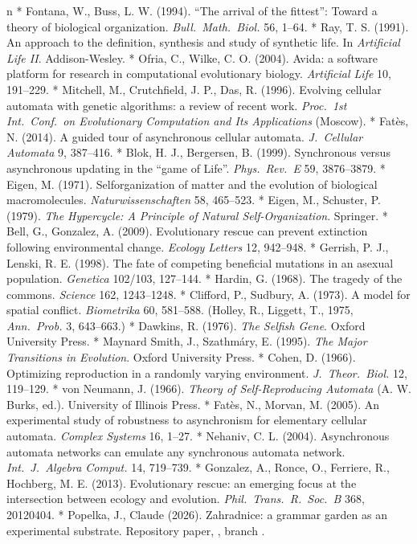 \begitems\style n
* Fontana, W., Buss, L. W. (1994). “The arrival of the fittest”:
Toward a theory of biological organization. {\it Bull.\ Math.\
Biol.} 56, 1--64.
* Ray, T. S. (1991). An approach to the definition, synthesis and
study of synthetic life. In {\it Artificial Life II}. Addison-Wesley.
* Ofria, C., Wilke, C. O. (2004). Avida: a software platform for
research in computational evolutionary biology. {\it Artificial
Life} 10, 191--229.
* Mitchell, M., Crutchfield, J. P., Das, R. (1996). Evolving
cellular automata with genetic algorithms: a review of recent work.
{\it Proc.\ 1st Int.\ Conf.\ on Evolutionary Computation and Its
Applications} (Moscow).
* Fatès, N. (2014). A guided tour of asynchronous cellular
automata. {\it J.\ Cellular Automata} 9, 387--416.
* Blok, H. J., Bergersen, B. (1999). Synchronous versus
asynchronous updating in the “game of Life”. {\it Phys.\ Rev.\ E}
59, 3876--3879.
* Eigen, M. (1971). Selforganization of matter and the evolution
of biological macromolecules. {\it Naturwissenschaften} 58,
465--523.
* Eigen, M., Schuster, P. (1979). {\it The Hypercycle: A Principle
of Natural Self-Organization}. Springer.
* Bell, G., Gonzalez, A. (2009). Evolutionary rescue can prevent
extinction following environmental change. {\it Ecology Letters}
12, 942--948.
* Gerrish, P. J., Lenski, R. E. (1998). The fate of competing
beneficial mutations in an asexual population. {\it Genetica}
102/103, 127--144.
* Hardin, G. (1968). The tragedy of the commons. {\it Science} 162,
1243--1248.
* Clifford, P., Sudbury, A. (1973). A model for spatial conflict.
{\it Biometrika} 60, 581--588. (Holley, R., Liggett, T., 1975,
{\it Ann.\ Prob.} 3, 643--663.)
* Dawkins, R. (1976). {\it The Selfish Gene}. Oxford University
Press.
* Maynard Smith, J., Szathmáry, E. (1995). {\it The Major
Transitions in Evolution}. Oxford University Press.
* Cohen, D. (1966). Optimizing reproduction in a randomly varying
environment. {\it J.\ Theor.\ Biol.} 12, 119--129.
* von Neumann, J. (1966). {\it Theory of Self-Reproducing
Automata} (A. W. Burks, ed.). University of Illinois Press.
* Fatès, N., Morvan, M. (2005). An experimental study of robustness to asynchronism for elementary cellular automata. {\it Complex
Systems} 16, 1--27.
* Nehaniv, C. L. (2004). Asynchronous automata networks can
emulate any synchronous automata network. {\it Int.\ J.\ Algebra
Comput.} 14, 719--739.
* Gonzalez, A., Ronce, O., Ferriere, R., Hochberg, M. E. (2013).
Evolutionary rescue: an emerging focus at the intersection between
ecology and evolution. {\it Phil.\ Trans.\ R.\ Soc.\ B} 368,
20120404.
* Popelka, J., Claude (2026). Zahradnice: a grammar garden as an
experimental substrate. Repository paper,
, branch .
\enditems

